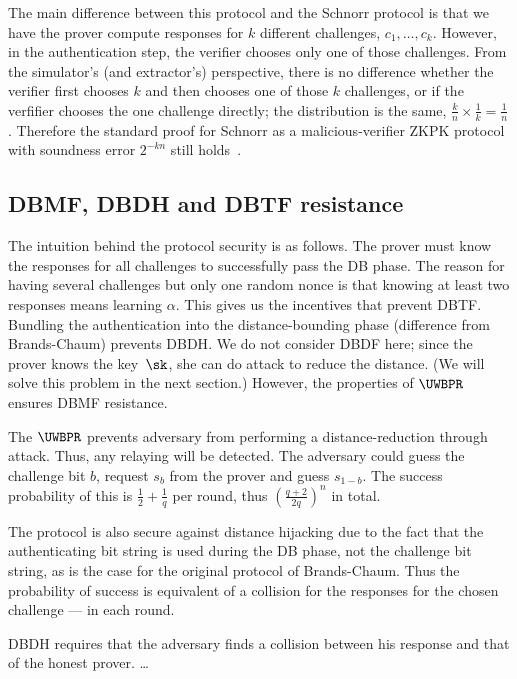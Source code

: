 The main difference between this protocol and the Schnorr protocol is that we 
have the prover compute responses for \(k\) different challenges, \(c_1, 
  \dotsc, c_k\).
However, in the authentication step, the verifier chooses only one of those 
challenges.
From the simulator's (and extractor's) perspective, there is no difference 
whether the verifier first chooses \(k\) and then chooses one of those \(k\) 
challenges, or if the verfifier chooses the one challenge directly;
the distribution is the same, \(\frac{k}{n}\times \frac{1}{k} = \frac{1}{n}\).
Therefore the standard proof for Schnorr as a malicious-verifier \ac{ZKPK} 
protocol with soundness error \(2^{-kn}\) still 
holds~\cite[\eg][]{OnSigmaProtocols}.

\subsection{\acs*{DBMF}, \acs*{DBDH} and \acs*{DBTF} resistance}

The intuition behind the protocol security is as follows.
The prover must know the responses for all challenges to successfully pass the 
\ac{DB} phase.
The reason for having several challenges but only one random nonce is that 
knowing at least two responses means learning \(\alpha\).
This gives us the incentives that prevent \ac{DBTF}.
Bundling the authentication into the distance-bounding phase (difference from 
Brands-Chaum) prevents \ac{DBDH}.
We do not consider \ac{DBDF} here; since the prover knows the key~\(\sk\), she 
can do  attack to reduce the distance.
(We will solve this problem in the next section.)
However, the properties of \(\UWBPR\) ensures \ac{DBMF} resistance.

The \(\UWBPR\) prevents  adversary from performing a 
distance-reduction through  attack.
Thus, any relaying will be detected.
The adversary could guess the challenge bit \(b\), request \(s_b\) from the 
prover and guess \(s_{1-b}\).
The success probability of this is \(\frac{1}{2} + \frac{1}{q}\) per round, 
thus \((\frac{q + 2}{2q})^n\) in total.

The protocol is also secure against distance hijacking due to the fact that the 
authenticating bit string is used during the \ac{DB} phase, not the challenge 
bit string, as is the case for the original protocol of Brands-Chaum.
Thus the probability of success is equivalent of a collision for the responses 
for the chosen challenge --- in each round.

\Ac{DBDH} requires that the adversary finds a collision between his response 
and that of the honest prover.
\dots

